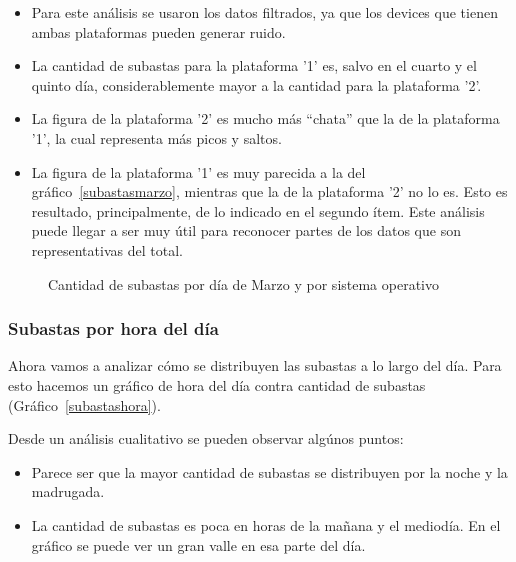 \documentclass[a4paper, 12pt]{article}
\begin{document}
	\begin{itemize}
		\item Para este análisis se usaron los datos filtrados, ya que los devices que tienen ambas plataformas pueden generar ruido.
		\item La cantidad de subastas para la plataforma '1' es, salvo en el cuarto y el quinto día, considerablemente mayor a la cantidad para la plataforma '2'.
		\item La figura de la plataforma '2' es mucho más ``chata'' que la de la plataforma '1', la cual representa más picos y saltos.
		\item La figura de la plataforma '1' es muy parecida a la del gráfico~\ref{subastasmarzo}, mientras que la de la plataforma '2' no lo es. Esto es resultado, principalmente, de lo indicado en el segundo ítem. Este análisis puede llegar a ser muy útil para reconocer partes de los datos que son representativas del total.
	\end{itemize}


	\begin{figure}[H]
			\centering
		   	\caption{Cantidad de subastas por día de Marzo y por sistema operativo}
		   	\label{subastasmarzoSO}
	\end{figure}

	\subsubsection{Subastas por hora del día}
	 Ahora vamos a analizar cómo se distribuyen las subastas a lo largo del día. Para esto hacemos un gráfico de hora del día contra cantidad de subastas (Gráfico~\ref{subastashora}).
	 
	 Desde un análisis cualitativo se pueden observar algúnos puntos:
	 
	 
	\begin{itemize}
		\item Parece ser que la mayor cantidad de subastas se distribuyen por la noche y la madrugada.
		\item La cantidad de subastas es poca en horas de la mañana y el mediodía. En el gráfico se puede ver un gran valle en esa parte del día.
	\end{itemize}
\end{document}
